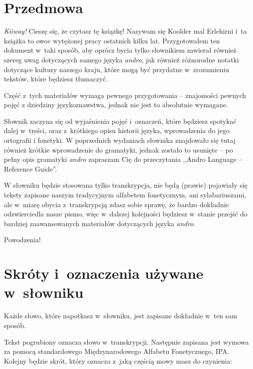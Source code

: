 \newpage

\section{Przedmowa}

\begin{spacing}{1.1}

\emph{Kiiway!} Cieszę się, że czytasz tę książkę! Nazywam się Koolder mal
Erlehirni i~ta książka to owoc wytężonej pracy ostatnich kilku lat.
Przygotowałem ten dokument w~taki sposób, aby oprócz bycia tylko słownikiem
zawierał również szereg uwag dotyczących samego języka \emph{andro}, jak
również różnorodne notatki dotyczące kultury naszego kraju, które mogą być
przydatne w~zrozumieniu tekstów, które będziesz tłumaczyć.

Część z~tych materiałów wymaga pewnego przygotowania -- znajomości pewnych pojęć
z dziedziny językoznawstwa, jednak nie jest to absolutnie wymagane.

Słownik zaczyna się od wyjaśnienia pojęć i~oznaczeń, które będziesz spotykać
dalej w~treści, oraz z~krótkiego opisu historii języka, wprowadzenia do jego
ortografii i fonetyki. W poprzednich wydaniach słownika znajdowało się tutaj
również krótkie wprowadzenie do gramatyki, jednak zostało to usunięte -- po
pełny opis gramatyki \emph{andro} zapraszam Cię do przeczytania ,,Andro Language
-- Reference Guide''.

W słowniku będzie stosowana tylko transkrypcja, nie będą (prawie) pojawiały się
teksty zapisane naszym tradycyjnym alfabetem fonetycznym, ani sylabariuszami,
ale w~miarę obycia z~transkrypcją zdasz sobie sprawę, że bardzo dokładnie
odzwierciedla nasze pismo, więc w~dalszej kolejności będziesz w~stanie przejść
do bardziej zaawansowanych materiałów dotyczących języka \emph{andro}.

\bigskip

Powodzenia!

\section[Skróty i~oznaczenia]{Skróty i~oznaczenia używane w~słowniku}

Każde słowo, które napotkasz w~słowniku, jest zapisane dokładnie w~ten sam
sposób.

Tekst pogrubiony oznacza słowo w~transkrypcji. Następnie zapisana jest wymowa za
pomocą standardowego Międzynarodowego Alfabetu Fonetycznego, IPA. Kolejny będzie
skrót, który oznacza z~jaką częścią mowy masz do czynienia:


\end{spacing}
